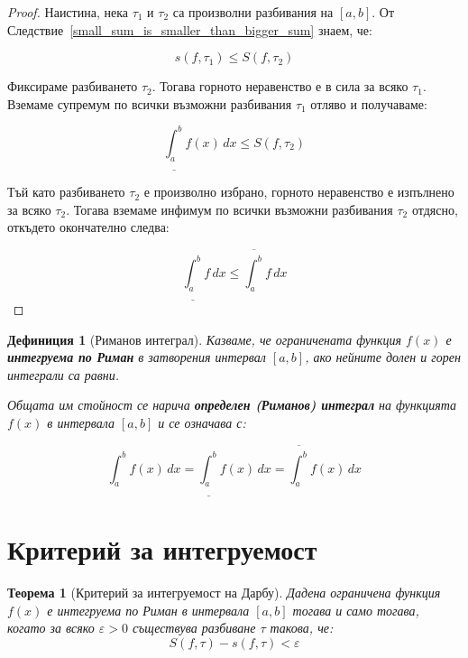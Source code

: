 \documentclass{scrartcl}
\newtheorem{theorem}{Теорема}
\newtheorem{definition}{Дефиниция}
\begin{document}
\begin{FlushLeft}
\begin{proof}
Наистина, нека $\tau_1$ и $\tau_2$ са произволни разбивания на $[a,b]$. От Следствие~\ref{small_sum_is_smaller_than_bigger_sum} знаем, че:

\[ s(f, \tau_1) \le S(f, \tau_2) \]

Фиксираме разбиването $\tau_2$. Тогава горното неравенство е в сила за всяко $\tau_1$. Вземаме супремум по всички възможни разбивания $\tau_1$ отляво и получаваме:

\[ \underline{\int_a^b} f(x)\,dx \le S(f, \tau_2) \]

Тъй като разбиването $\tau_2$ е произволно избрано, горното неравенство е изпълнено за всяко $\tau_2$. Тогава вземаме инфимум по всички възможни разбивания $\tau_2$ отдясно, откъдето окончателно следва:

\[ \underline{\int_a^b} f\,dx \le \overline{\int_a^b} f\,dx \]
\end{proof}

\begin{definition}[Риманов интеграл]
Казваме, че ограничената функция $f(x)$ е \textbf{интегруема по Риман} в затворения интервал $[a, b]$, ако нейните долен и горен интеграли са равни. 

Общата им стойност се нарича \textbf{определен (Риманов) интеграл} на функцията $f(x)$ в интервала $[a, b]$ и се означава с:

\[ \int_{a}^{b} f(x)\,dx = \underline{\int_{a}^{b}} f(x)\,dx = \overline{\int_{a}^{b}} f(x)\,dx \]
\end{definition}

\section{Критерий за интегруемост}

\begin{theorem}[Критерий за интегруемост на Дарбу]\label{thm:darboux-criterion}
Дадена ограничена функция $f(x)$ е интегруема по Риман в интервала $[a, b]$ тогава и само тогава, когато за всяко $\varepsilon > 0$ съществува разбиване $\tau$ такова, че:
\[ S(f, \tau) - s(f, \tau) < \varepsilon \]
\end{theorem}


\end{FlushLeft}
\end{document}
